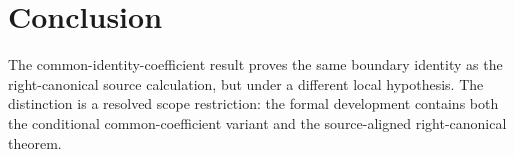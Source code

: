 \documentclass{article}
\begin{document}
\section{Conclusion}

The common-identity-coefficient result proves the same boundary identity as the
right-canonical source calculation, but under a different local hypothesis.
The distinction is a resolved scope restriction: the formal development
contains both the conditional common-coefficient variant and the
source-aligned right-canonical theorem.



\end{document}
